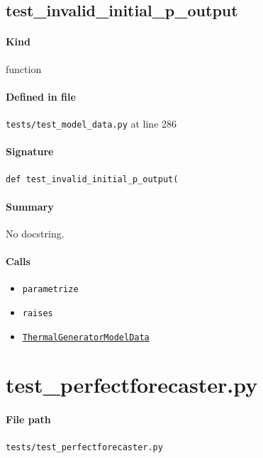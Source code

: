 \documentclass[11pt]{report}
\begin{document}
\subsection{test\_invalid\_initial\_p\_output}
\label{def:tests-test_model_data.py:test_invalid_initial_p_output:L286}
\paragraph{Kind} function
\paragraph{Defined in file} \texttt{tests/test\_model\_data.py} at line 286
\paragraph{Signature} \texttt{def test\_invalid\_initial\_p\_output(}
\paragraph{Summary} No docstring.
\paragraph{Calls}
\begin{itemize}[leftmargin=*]
  \item \texttt{parametrize}
  \item \texttt{raises}
  \item \hyperref[def:model_data.py:ThermalGeneratorModelData:L185]{\texttt{ThermalGeneratorModelData}}
\end{itemize}

\section{test\_perfectforecaster.py}
\label{file:tests-test_perfectforecaster.py}
\paragraph{File path} \texttt{tests/test\_perfectforecaster.py}
\end{document}
